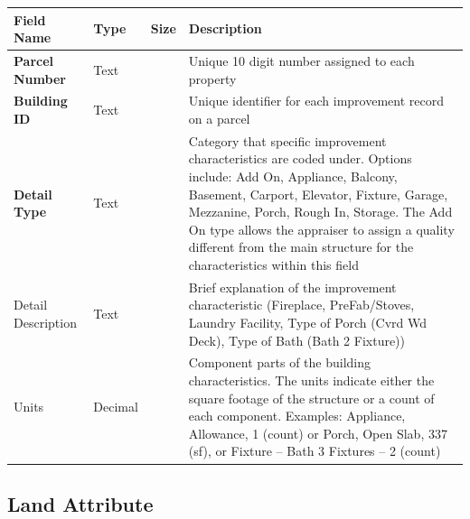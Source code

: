 \documentclass[
  english,
  letterpaper,
  DIV=11,
  numbers=noendperiod]{scrreprt}
\begin{document}
\begin{longtable}[]{@{}
  >{\raggedright\arraybackslash}p{}
  >{\raggedright\arraybackslash}p{}
  >{\raggedright\arraybackslash}p{}
  >{\raggedright\arraybackslash}p{}@{}}
\toprule\noalign{}
\begin{minipage}[b]{\linewidth}\raggedright
Field Name
\end{minipage} & \begin{minipage}[b]{\linewidth}\raggedright
Type
\end{minipage} & \begin{minipage}[b]{\linewidth}\raggedright
Size
\end{minipage} & \begin{minipage}[b]{\linewidth}\raggedright
Description
\end{minipage} \\
\midrule\noalign{}
\endhead
\bottomrule\noalign{}
\endlastfoot
\textbf{Parcel Number} & Text & 10 & Unique 10 digit number assigned to
each property \\
\textbf{Building ID} & Text & 5 & Unique identifier for each improvement
record on a parcel \\
\textbf{Detail Type} & Text & 10 & Category that specific improvement
characteristics are coded under. Options include: Add On, Appliance,
Balcony, Basement, Carport, Elevator, Fixture, Garage, Mezzanine, Porch,
Rough In, Storage. The Add On type allows the appraiser to assign a
quality different from the main structure for the characteristics within
this field \\
Detail Description & Text & 50 & Brief explanation of the improvement
characteristic (Fireplace, PreFab/Stoves, Laundry Facility, Type of
Porch (Cvrd Wd Deck), Type of Bath (Bath 2 Fixture)) \\
Units & Decimal & 15.4 & Component parts of the building
characteristics. The units indicate either the square footage of the
structure or a count of each component. Examples: Appliance, Allowance,
1 (count) or Porch, Open Slab, 337 (sf), or Fixture -- Bath 3 Fixtures
-- 2 (count) \\
\end{longtable}

\subsection{Land Attribute}
\end{document}
